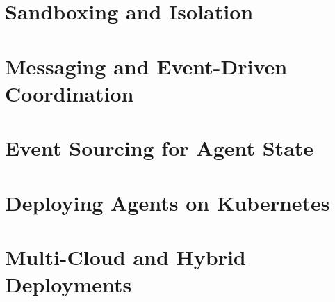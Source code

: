 \documentclass[
  11pt,
  twoside,
  openright
]{book}
\begin{document}
\chapter{Sandboxing and Isolation}
\label{ch:sandboxing}

\chapter{Messaging and Event-Driven Coordination}
\label{ch:messaging}

\chapter{Event Sourcing for Agent State}
\label{ch:event-sourcing}

\chapter{Deploying Agents on Kubernetes}
\label{ch:kubernetes}

\chapter{Multi-Cloud and Hybrid Deployments}
\label{ch:multi-cloud}
\end{document}
